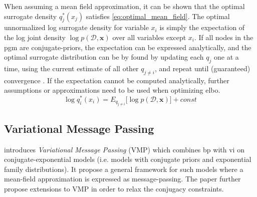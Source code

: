 When assuming a mean field approximation, it can be shown that the optimal surrogate density $q_j^*(x_j)$ satisfies \cref{eq:optimal_mean_field}. The optimal unnormalized log surrogate density for variable $x_i$ is simply the expectation of the log joint density $\log p(\mathcal{D}, \boldsymbol{x})$ over all variables except $x_i$. If all nodes in the \acrshort{pgm} are conjugate-priors, the expectation can be expressed analytically, and the optimal surrogate distribution can be by found  by updating each $q_j$ one at a time, using the current estimate of all other $q_{j\neq i}$, and repeat until (guaranteed) convergence \cite{bishop2007}. If the expectation cannot be computed analytically, further assumptions or approximations need to be used when optimizing \acrshort{elbo}.
\begin{equation}\label{eq:optimal_mean_field}
    \log q_i^*(x_i) = E_{q_{j \neq i}}\big[\log p(\mathcal{D}, \mathbf{x}) \big] + const
\end{equation}

\subsection{Variational Message Passing}
\cite{winnbishop} introduces \textit{Variational Message Passing} (VMP) which combines \acrshort{bp} with \acrshort{vi} on conjugate-exponential models (i.e. models with conjugate priors and exponential family distributions). It propose a general framework for such models where a mean-field approximation is expressed as message-passing. The paper further propose extensions to VMP in order to relax the conjugacy constraints.
